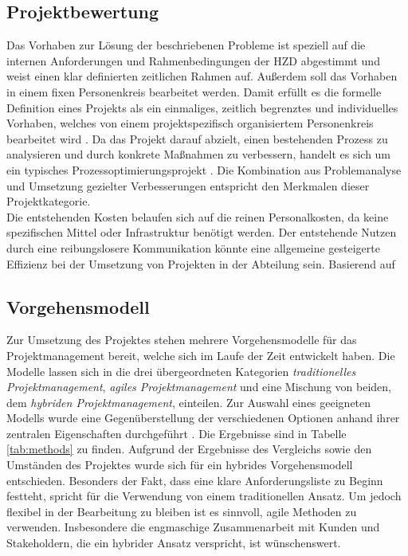 \documentclass[ThesisDJ.tex]{subfiles}
\begin{document}
	\subsection{Projektbewertung}
  Das Vorhaben zur Lösung der beschriebenen Probleme ist speziell auf die internen Anforderungen und Rahmenbedingungen der HZD abgestimmt 
  und weist einen klar definierten zeitlichen Rahmen auf. Außerdem soll das Vorhaben in einem fixen Personenkreis bearbeitet werden.
  Damit erfüllt es die formelle Definition eines Projekts als ein einmaliges, zeitlich begrenztes und individuelles Vorhaben,
  welches von einem projektspezifisch organisiertem Personenkreis bearbeitet wird \cite{bronimann_projektmanagement_2022} \cite[S.~5]{dechange_projektmanagement_2024}. 
  Da das Projekt darauf abzielt, einen bestehenden Prozess zu analysieren und durch konkrete Maßnahmen zu verbessern, 
  handelt es sich um ein typisches Prozessoptimierungsprojekt \cite[S.~8]{kuster_handbuch_2022}. Die Kombination aus Problemanalyse und Umsetzung 
  gezielter Verbesserungen entspricht den Merkmalen dieser Projektkategorie. \\

  Die entstehenden Kosten belaufen sich auf die reinen Personalkosten, da keine spezifischen Mittel oder Infrastruktur benötigt werden. Der entstehende
  Nutzen durch eine reibungslosere Kommunikation könnte eine allgemeine gesteigerte Effizienz bei der Umsetzung von Projekten in der Abteilung sein. Basierend 
  auf 

  \subsection{Vorgehensmodell}
  Zur Umsetzung des Projektes stehen mehrere Vorgehensmodelle für das Projektmanagement bereit, welche sich im Laufe der Zeit entwickelt haben. Die Modelle lassen sich in die 
  drei übergeordneten Kategorien \emph{traditionelles Projektmanagement}, \emph{agiles Projektmanagement} und eine Mischung von beiden, dem \emph{hybriden Projektmanagement},
  einteilen. Zur Auswahl eines geeigneten Modells wurde eine Gegenüberstellung der verschiedenen Optionen anhand ihrer zentralen Eigenschaften durchgeführt \cite[S.~405ff]{wysocki_effective_nodate} \cite[S.~15ff]{kuster_handbuch_2022}. Die Ergebnisse sind in 
  Tabelle \ref{tab:methods} zu finden. Aufgrund der Ergebnisse des Vergleichs sowie den Umständen des Projektes wurde sich für ein hybrides Vorgehensmodell entschieden.
  Besonders der Fakt, dass eine klare Anforderungsliste zu Beginn festteht, spricht für die Verwendung von einem traditionellen Ansatz. Um jedoch flexibel in der Bearbeitung zu bleiben ist es sinnvoll,
  agile Methoden zu verwenden. Insbesondere die engmaschige Zusammenarbeit mit Kunden und Stakeholdern, die ein hybrider Ansatz verspricht, ist wünschenswert.
\end{document}
